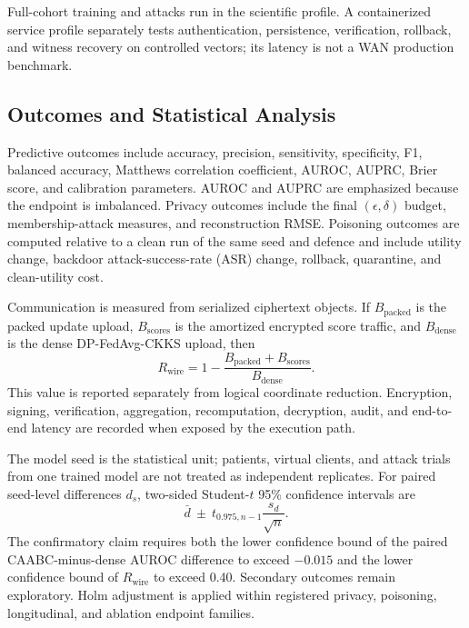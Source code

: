 \documentclass[conference]{IEEEtran}
\begin{document}
Full-cohort training and attacks run in the scientific profile. A containerized
service profile separately tests authentication, persistence, verification,
rollback, and witness recovery on controlled vectors; its latency is not a WAN
production benchmark.

\subsection{Outcomes and Statistical Analysis}

Predictive outcomes include accuracy, precision, sensitivity, specificity, F1,
balanced accuracy, Matthews correlation coefficient, AUROC, AUPRC, Brier score,
and calibration parameters. AUROC and AUPRC are emphasized because the endpoint
is imbalanced. Privacy outcomes include the final $(\epsilon,\delta)$ budget,
membership-attack measures, and reconstruction RMSE. Poisoning outcomes are
computed relative to a clean run of the same seed and defence and include
utility change, backdoor attack-success-rate (ASR) change, rollback, quarantine,
and clean-utility cost.

Communication is measured from serialized ciphertext objects. If
$B_{\mathrm{packed}}$ is the packed update upload, $B_{\mathrm{scores}}$ is the
amortized encrypted score traffic, and $B_{\mathrm{dense}}$ is the dense
DP-FedAvg-CKKS upload, then
\begin{equation}
R_{\mathrm{wire}}=1-
\frac{B_{\mathrm{packed}}+B_{\mathrm{scores}}}{B_{\mathrm{dense}}}.
\label{eq:paper-wire-reduction}
\end{equation}
This value is reported separately from logical coordinate reduction.
Encryption, signing, verification, aggregation, recomputation, decryption,
audit, and end-to-end latency are recorded when exposed by the execution path.

The model seed is the statistical unit; patients, virtual clients, and attack
trials from one trained model are not treated as independent replicates. For
paired seed-level differences $d_s$, two-sided Student-$t$ 95\% confidence
intervals are
\begin{equation}
\bar d\ \pm\ t_{0.975,n-1}\frac{s_d}{\sqrt{n}}.
\label{eq:paper-paired-ci}
\end{equation}
The confirmatory claim requires both the lower confidence bound of the paired
CAABC-minus-dense AUROC difference to exceed $-0.015$ and the lower confidence
bound of $R_{\mathrm{wire}}$ to exceed 0.40. Secondary outcomes remain
exploratory. Holm adjustment is applied within registered privacy, poisoning,
longitudinal, and ablation endpoint families.
\end{document}
